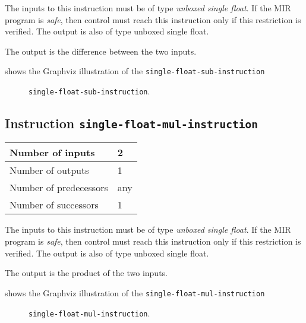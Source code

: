The inputs to this instruction must be of type \emph{unboxed single
  float}.  If the MIR program is \emph{safe}, then control must reach
this instruction only if this restriction is verified.  The output is
also of type unboxed single float.

The output is the difference between the two inputs.

 shows the Graphviz illustration of the
\texttt{single-float-sub-instruction}

\begin{figure}
\begin{center}
\end{center}
\caption{\label{fig-single-float-sub-instruction}
\texttt{single-float-sub-instruction}.}
\end{figure}

\subsection{Instruction \texttt{single-float-mul-instruction}}
\label{mir-instruction-single-float-mul}

\begin{tabular}{|l|l|}
\hline
Number of inputs & 2\\
\hline
Number of outputs & 1\\
\hline
Number of predecessors & any\\
\hline
Number of successors & 1\\
\hline
\end{tabular}

The inputs to this instruction must be of type \emph{unboxed single
  float}.  If the MIR program is \emph{safe}, then control must reach
this instruction only if this restriction is verified.  The output is
also of type unboxed single float.

The output is the product of the two inputs.

 shows the Graphviz illustration of the
\texttt{single-float-mul-instruction}

\begin{figure}
\begin{center}
\end{center}
\caption{\label{fig-single-float-mul-instruction}
\texttt{single-float-mul-instruction}.}
\end{figure}

